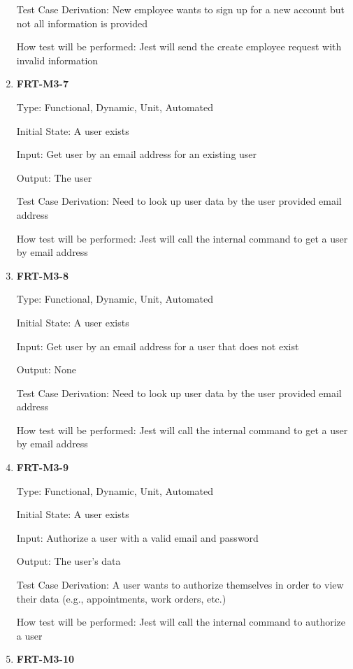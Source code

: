 \documentclass[12pt, titlepage]{article}
\begin{document}
\begin{enumerate}
	      Test Case Derivation: New employee wants to sign up for a new account but not all information is
	      provided

	      How test will be performed: Jest will send the create employee request with invalid information

	\item \textbf{FRT-M3-7}

	      Type: Functional, Dynamic, Unit, Automated

	      Initial State: A user exists

	      Input: Get user by an email address for an existing user

	      Output: The user

	      Test Case Derivation: Need to look up user data by the user provided email address

	      How test will be performed: Jest will call the internal command to get a user by email address

	\item \textbf{FRT-M3-8}

	      Type: Functional, Dynamic, Unit, Automated

	      Initial State: A user exists

	      Input: Get user by an email address for a user that does not exist

	      Output: None

	      Test Case Derivation: Need to look up user data by the user provided email address

	      How test will be performed: Jest will call the internal command to get a user by email address

	\item \textbf{FRT-M3-9}

	      Type: Functional, Dynamic, Unit, Automated

	      Initial State: A user exists

	      Input: Authorize a user with a valid email and password

	      Output: The user's data

	      Test Case Derivation: A user wants to authorize themselves in order to view their data (e.g.,
	      appointments, work orders, etc.)

	      How test will be performed: Jest will call the internal command to authorize a user

	\item \textbf{FRT-M3-10}


\end{enumerate}
\end{document}
